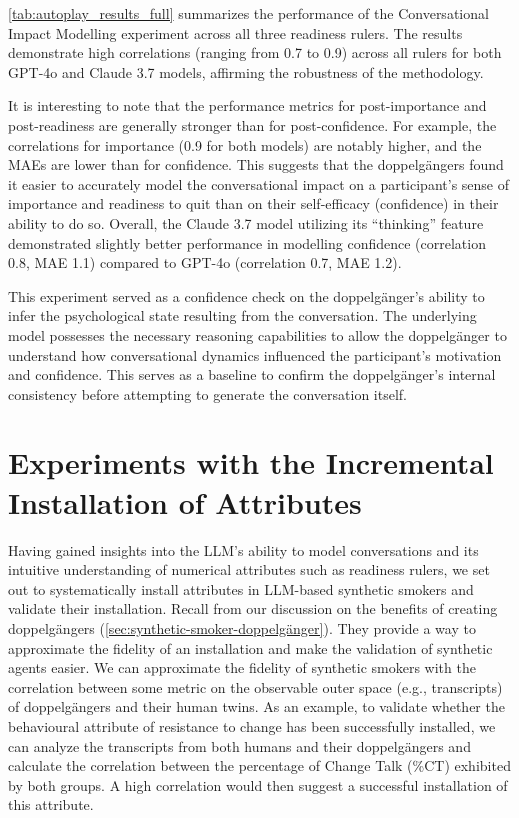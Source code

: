 \cref{tab:autoplay_results_full} summarizes the performance of the Conversational Impact Modelling experiment across all three readiness rulers. The results demonstrate high correlations (ranging from 0.7 to 0.9) across all rulers for both GPT-4o and Claude 3.7 models, affirming the robustness of the methodology.

It is interesting to note that the performance metrics for post-importance and post-readiness are generally stronger than for post-confidence. For example, the correlations for importance (0.9 for both models) are notably higher, and the MAEs are lower than for confidence. This suggests that the doppelgängers found it easier to accurately model the conversational impact on a participant's sense of importance and readiness to quit than on their self-efficacy (confidence) in their ability to do so. Overall, the Claude 3.7 model utilizing its ``thinking'' feature demonstrated slightly better performance in modelling confidence (correlation 0.8, MAE 1.1) compared to GPT-4o (correlation 0.7, MAE 1.2).



This experiment served as a confidence check on the doppelgänger's ability to infer the psychological state resulting from the conversation. The underlying model possesses the necessary reasoning capabilities to allow the doppelgänger to understand how conversational dynamics influenced the participant's motivation and confidence. This serves as a baseline to confirm the doppelgänger's internal consistency before attempting to generate the conversation itself.



\section{Experiments with the Incremental Installation of Attributes}
Having gained insights into the LLM's ability to model conversations and its intuitive understanding of numerical attributes such as readiness rulers, we set out to systematically install attributes in LLM-based synthetic smokers and validate their installation. Recall from our discussion on the benefits of creating doppelgängers (\cref{sec:synthetic-smoker-doppelgänger}). They provide a way to approximate the fidelity of an installation and make the validation of synthetic agents easier. We can approximate the fidelity of synthetic smokers with the correlation between some metric on the observable outer space (e.g., transcripts) of doppelgängers and their human twins. As an example, to validate whether the behavioural attribute of resistance to change has been successfully installed, we can analyze the transcripts from both humans and their doppelgängers and calculate the correlation between the percentage of Change Talk (\%CT) exhibited by both groups. A high correlation would then suggest a successful installation of this attribute.


